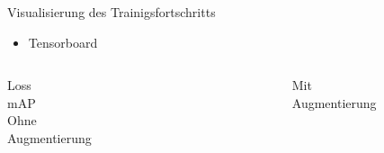 \begin{frame}{Visualisierung des Trainigsfortschritts}
    \begin{itemize}
        \item Tensorboard
    \end{itemize}
    \begin{columns}[T]
        \vspace{1.5cm}
        Loss\\
        \vspace{3cm}
        mAP\\
        

        \centering
        \small Ohne Augmentierung
        \begin{figure}
            \centering
            \def\svgwidth{0.7\columnwidth}
            \footnotesize
            
        \end{figure}

        \begin{figure}
            \centering
            \def\svgwidth{0.7\columnwidth}
            \footnotesize
            
        \end{figure}
        

        \centering
        \small Mit Augmentierung

        \begin{figure}
            \centering
            \def\svgwidth{0.7\columnwidth}
            \footnotesize
            
        \end{figure}
        \begin{figure}
            \centering
            \def\svgwidth{0.7\columnwidth}
            \footnotesize
            
        \end{figure}
        
    \end{columns}
\end{frame}



